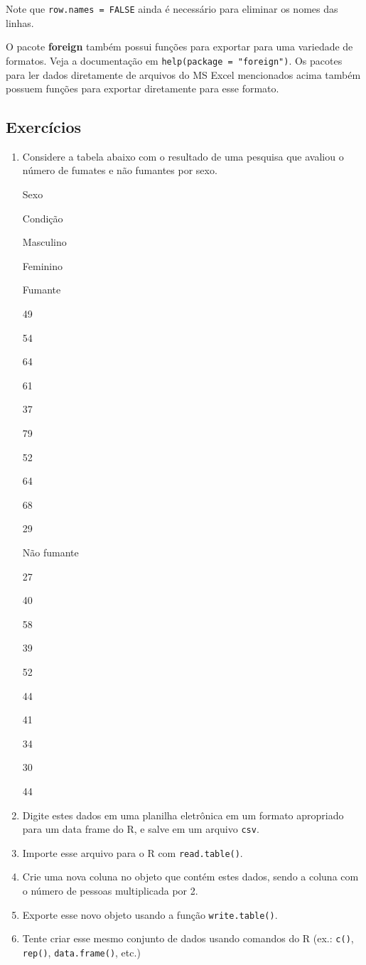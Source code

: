 \documentclass[10pt,a4paper]{book}
\providecommand{\tightlist}{%
  \setlength{\itemsep}{0pt}\setlength{\parskip}{0pt}}
\begin{document}
Note que \texttt{row.names\ =\ FALSE} ainda é necessário para eliminar
os nomes das linhas.

O pacote \textbf{foreign} também possui funções para exportar para uma
variedade de formatos. Veja a documentação em
\texttt{help(package\ =\ "foreign")}. Os pacotes para ler dados
diretamente de arquivos do MS Excel mencionados acima também possuem
funções para exportar diretamente para esse formato.

\subsection*{Exercícios}\label{exercicios-11}


\begin{enumerate}
\def\labelenumi{\arabic{enumi}.}
\tightlist
\item
  Considere a tabela abaixo com o resultado de uma pesquisa que avaliou
  o número de fumates e não fumantes por sexo.

  Sexo

  Condição

  Masculino

  Feminino

  Fumante

  49

  54

  64

  61

  37

  79

  52

  64

  68

  29

  Não fumante

  27

  40

  58

  39

  52

  44

  41

  34

  30

  44
\item
  Digite estes dados em uma planilha eletrônica em um formato apropriado
  para um data frame do R, e salve em um arquivo \texttt{csv}.
\item
  Importe esse arquivo para o R com \texttt{read.table()}.
\item
  Crie uma nova coluna no objeto que contém estes dados, sendo a coluna
  com o número de pessoas multiplicada por 2.
\item
  Exporte esse novo objeto usando a função \texttt{write.table()}.
\item
  Tente criar esse mesmo conjunto de dados usando comandos do R (ex.:
  \texttt{c()}, \texttt{rep()}, \texttt{data.frame()}, etc.)
\end{enumerate}
\end{document}
